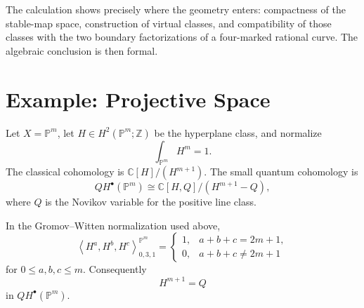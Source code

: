 The calculation shows precisely where the geometry enters: compactness of the
stable-map space, construction of virtual classes, and compatibility of those
classes with the two boundary factorizations of a four-marked rational curve.
The algebraic conclusion is then formal.

\section{Example: Projective Space}

Let \(X=\mathbb P^m\), let \(H\in H^2(\mathbb P^m;\mathbb Z)\) be the
hyperplane class, and normalize
\[
  \int_{\mathbb P^m}H^m=1.
\]
The classical cohomology is \(\mathbb C[H]/(H^{m+1})\).  The small quantum
cohomology is
\[
  QH^\bullet(\mathbb P^m)
  \cong
  \mathbb C[H,Q]/(H^{m+1}-Q),
\]
where \(Q\) is the Novikov variable for the positive line class.

\begin{proposition}
\label{prop:projective-degree-one-instanton-relation}
In the Gromov--Witten normalization used above,
\[
  \left\langle H^a,H^b,H^c\right\rangle_{0,3,1}^{\mathbb P^m}
  =
  \begin{cases}
    1, & a+b+c=2m+1,\\
    0, & a+b+c\neq 2m+1
  \end{cases}
\]
for \(0\leq a,b,c\leq m\).  Consequently
\[
  H^{m+1}=Q
\]
in \(QH^\bullet(\mathbb P^m)\).
\end{proposition}

